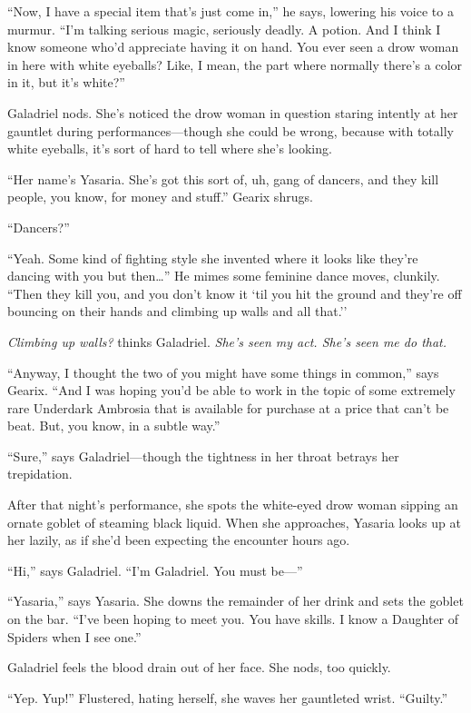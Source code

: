 \documentclass[smalldemyvopaper,11pt,twoside,onecolumn,openright,extrafontsizes]{memoir}
\begin{document}
``Now, I have a special item that's just come in,'' he says, lowering
his voice to a murmur. ``I'm talking serious magic, seriously deadly. A
potion. And I think I know someone who'd appreciate having it on hand.
You ever seen a drow woman in here with white eyeballs? Like, I mean,
the part where normally there's a color in it, but it's white?''

Galadriel nods. She's noticed the drow woman in question staring
intently at her gauntlet during performances---though she could be
wrong, because with totally white eyeballs, it's sort of hard to tell
where she's looking.

``Her name's Yasaria. She's got this sort of, uh, gang of dancers, and
they kill people, you know, for money and stuff.'' Gearix shrugs.

``Dancers?''

``Yeah. Some kind of fighting style she invented where it looks like
they're dancing with you but then\ldots{}'' He mimes some feminine dance
moves, clunkily. ``Then they kill you, and you don't know it `til you
hit the ground and they're off bouncing on their hands and climbing up
walls and all that.''

\emph{Climbing up walls?} thinks Galadriel. \emph{She's seen my act.
She's seen me do that.}

``Anyway, I thought the two of you might have some things in common,''
says Gearix. ``And I was hoping you'd be able to work in the topic of
some extremely rare Underdark Ambrosia that is available for purchase at
a price that can't be beat. But, you know, in a subtle way.''

``Sure,'' says Galadriel---though the tightness in her throat betrays
her trepidation.

After that night's performance, she spots the white-eyed drow woman
sipping an ornate goblet of steaming black liquid. When she approaches,
Yasaria looks up at her lazily, as if she'd been expecting the encounter
hours ago.

``Hi,'' says Galadriel. ``I'm Galadriel. You must be---''

``Yasaria,'' says Yasaria. She downs the remainder of her drink and sets
the goblet on the bar. ``I've been hoping to meet you. You have skills.
I know a Daughter of Spiders when I see one.''

Galadriel feels the blood drain out of her face. She nods, too quickly.

``Yep. Yup!'' Flustered, hating herself, she waves her gauntleted wrist.
``Guilty.''
\end{document}
